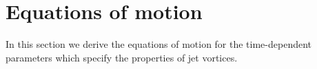\documentclass[12pt]{amsart}
\newcommand{\R}{\ensuremath{\mathbb{R}}}
\theoremstyle{remark}
\begin{document}
\section{Equations of motion}
\label{sec:EOM}
In this section we derive the equations of motion for the time-dependent parameters which specify the properties of jet vortices.

%
%
%
\end{document}
